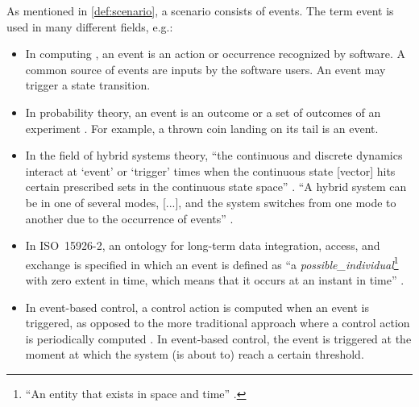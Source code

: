 As mentioned in \cref{def:scenario}, a scenario consists of events. 
The term event is used in many different fields, e.g.:
\begin{itemize}
	\item In computing \autocite{breu1997towards}, an event is an action or occurrence recognized by software. A common source of events are inputs by the software users. An event may trigger a state transition.
	
	\item In probability theory, an event is an outcome or a set of outcomes of an experiment \autocite{pfeiffer2013concepts}. For example, a thrown coin landing on its tail is an event.
	
	
	\item In the field of hybrid systems theory, ``the continuous and discrete dynamics interact at `event' or `trigger' times when the continuous state [vector] hits certain prescribed sets in the continuous state space'' \autocite{branicky1998hybridcontrol}. ``A hybrid system can be in one of several modes, [...], and the system switches from one mode to another due to the occurrence of events'' \autocite{deschutter2000optimal}.
	
	\cstartb\item In ISO~15926-2, an ontology for long-term data integration, access, and exchange is specified in which an event is defined as ``a \emph{possible\_individual}\footnote{\cstartb ``An entity that exists in space and time'' \autocite{batres2007upper}.\cendb} with zero extent in time, which means that it occurs at an instant in time'' \autocite{batres2007upper}. \cendb
	
	\item In event-based control, a control action is computed when an event is triggered, as opposed to the more traditional approach where a control action is periodically computed \autocite{heemels2012eventcontrol}. In event-based control, the event is triggered at the moment at which the system (is about to) reach a certain threshold.
\end{itemize}

